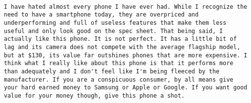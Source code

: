 \documentclass[
  11pt,
]{article}
\begin{document}
\begin{verbatim}
                                                                                                                                                                                                                                                                                                                                                                                                                                                                                                        I have hated almost every phone I have ever had. While I recognize the need to have a smartphone today, they are overpriced and underperforming and full of useless features that make them less useful and only look good on the spec sheet. That being said, I actually like this phone. It is not perfect. It has a little bit of lag and its camera does not compete with the average flagship model, but at $130, its value far outshines phones that are more expensive. I think what I really like about this phone is that it performs more than adequately and I don't feel like I'm being fleeced by the manufacturer. If you are a conspicuous consumer, by all means give your hard earned money to Samsung or Apple or Google. If you want good value for your money though, give this phone a shot.

\end{verbatim}
\end{document}
